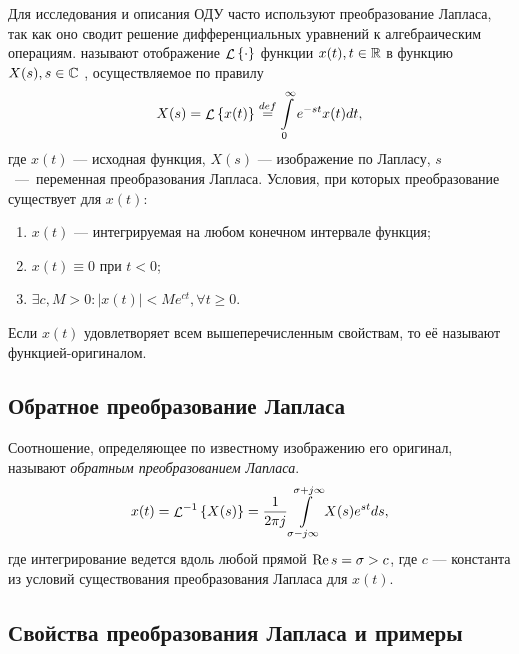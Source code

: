 \documentclass[../../TAU.tex]{subfiles}
\begin{document}
    Для исследования и описания ОДУ часто используют преобразование Лапласа, так как оно сводит решение дифференциальных уравнений к алгебраическим операциям.
     называют отображение 
    $\mathop{\mathcal{L}}\nolimits\left\{\cdot\right\}$ 
    функции 
    $x(t), t\in\mathbb{R}$
     в функцию 
    $X(s), s\in\mathbb{C}$
    , осуществляемое по правилу
    \begin{equation}
        X(s) = \mathop{\mathcal{L}}\nolimits\left\{x(t)\right\} \stackrel{def}{=} \int\limits_0^\infty e^{-st} x(t) dt,
    \end{equation}
    где $x(t)$ --- исходная функция, $X(s)$ --- изображение по Лапласу, $s$~---~переменная преобразования Лапласа.
    Условия, при которых преобразование существует для $x(t)$:
    \begin{enumerate}
        \item $x(t)$ --- интегрируемая на любом конечном интервале функция;
        \item $x(t)\equiv0$ при $t < 0$;
        \item $\exists c, M > 0: |x(t)| < M e^{ct}, \forall t \ge 0$.
    \end{enumerate}
    Если $x(t)$ удовлетворяет всем вышеперечисленным свойствам, то её называют функцией-оригиналом.

\subsection{Обратное преобразование Лапласа}

    Соотношение, определяющее по известному изображению его оригинал, называют {\it обратным преобразованием Лапласа}. 
    \begin{equation}
        x(t) = {\mathop{\mathcal{L}}\nolimits^{-1}\left\{X(s)\right\}} = \frac{1}{2\pi j} \int\limits_{\sigma-j\infty}^{\sigma + j\infty} X(s)e^{st} ds,
    \end{equation}
    где интегрирование ведется вдоль любой прямой 
    ${\mathop{\mathrm{Re}}\nolimits{s} = \sigma > c}$, 
    где $c$ --- константа из условий существования преобразования Лапласа для $x(t)$.

\subsection{Свойства преобразования Лапласа и примеры} 
\end{document}
